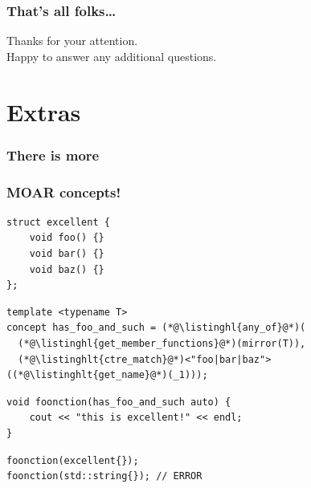 \documentclass[compress,table,xcolor=table]{beamer}
\begin{document}
\begin{frame}
  \frametitle{That's all folks\dots}
  \centering
  \Huge
  Thanks for your attention.\\
  \Large
  Happy to answer any additional questions.
\end{frame}
\section{Extras}
\begin{frame}
  \frametitle{There is more}
\end{frame}
\begin{frame}[fragile]
  \frametitle{MOAR  concepts!}
  \begin{lstlisting}[language=c++2x,basicstyle=\small\ttfamily]
struct excellent {
    void foo() {}
    void bar() {}
    void baz() {}
};
  \end{lstlisting}
  \vfill
  \begin{lstlisting}[language=c++2x,basicstyle=\small\ttfamily]
template <typename T>
concept has_foo_and_such = (*@\listinghl{any_of}@*)(
  (*@\listinghl{get_member_functions}@*)(mirror(T)),
  (*@\listinghlt{ctre_match}@*)<"foo|bar|baz">((*@\listinghlt{get_name}@*)(_1)));
  \end{lstlisting}
  \vfill
  \begin{lstlisting}[language=c++2x,basicstyle=\small\ttfamily]
void foonction(has_foo_and_such auto) {
    cout << "this is excellent!" << endl;
}
  \end{lstlisting}
  \vfill
  \begin{lstlisting}[language=c++2x,basicstyle=\small\ttfamily]
foonction(excellent{});
foonction(std::string{}); // ERROR
  \end{lstlisting}
\end{frame}
\end{document}
